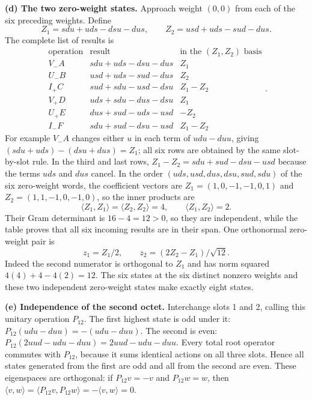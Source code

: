 \textbf{(d) The two zero-weight states.}
Approach weight $(0,0)$ from each of the six preceding weights.
Define
\[
Z_1=sdu+uds-dsu-dus,\qquad
Z_2=usd+uds-sud-dus.
\]
The complete list of results is
\[
\begin{array}{c|l|c}
\text{operation}&\text{result}&\text{in the }(Z_1,Z_2)\text{ basis}\\\hline
V_-A&sdu+uds-dsu-dus&Z_1\\
U_-B&usd+uds-sud-dus&Z_2\\
I_+C&sud+sdu-usd-dsu&Z_1-Z_2\\
V_+D&uds+sdu-dus-dsu&Z_1\\
U_+E&dus+sud-uds-usd&-Z_2\\
I_-F&sdu+sud-dsu-usd&Z_1-Z_2
\end{array}.
\]
For example $V_-A$ changes either $u$ in each term of
$udu-duu$, giving $(sdu+uds)-(dsu+dus)=Z_1$; all six rows
are obtained by the same slot-by-slot rule. In the third and last
rows, $Z_1-Z_2=sdu+sud-dsu-usd$ because the terms $uds$ and $dus$
cancel.
In the order $(uds,usd,dus,dsu,sud,sdu)$ of the six zero-weight
words, the coefficient vectors are
$Z_1=(1,0,-1,-1,0,1)$ and $Z_2=(1,1,-1,0,-1,0)$, so the inner
products are
\[
\langle Z_1,Z_1\rangle=\langle Z_2,Z_2\rangle=4,\qquad
\langle Z_1,Z_2\rangle=2.
\]
Their Gram determinant is $16-4=12>0$, so they are independent,
while the table proves that all six incoming results are in their span.
One orthonormal zero-weight pair is
\[
\boxed{z_1=Z_1/2,\qquad z_2=(2Z_2-Z_1)/\sqrt{12}}.
\]
Indeed the second numerator is orthogonal to $Z_1$ and has
norm squared $4(4)+4-4(2)=12$.
The six states at the six distinct nonzero weights and these two
independent zero-weight states make exactly eight states.

\textbf{(e) Independence of the second octet.}
Interchange slots 1 and 2, calling this unitary operation $P_{12}$.
The first highest state is odd under it:
$P_{12}(udu-duu)=-(udu-duu)$.
The second is even:
$P_{12}(2uud-udu-duu)=2uud-udu-duu$.
Every total root operator commutes with $P_{12}$, because it
sums identical actions on all three slots. Hence all states
generated from the first are odd and all from the second are even.
These eigenspaces are orthogonal: if $P_{12}v=-v$ and
$P_{12}w=w$, then
$\langle v,w\rangle=\langle P_{12}v,P_{12}w\rangle
=-\langle v,w\rangle=0$.

